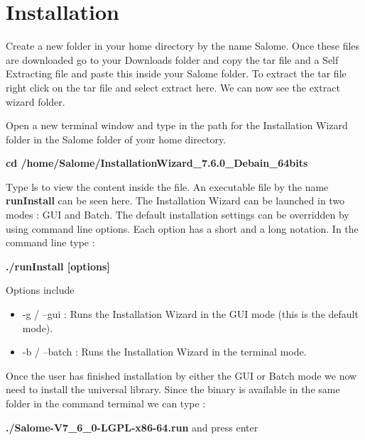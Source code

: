 \section{Installation}

Create a new folder in your home directory by the name Salome. Once these files are downloaded go to your Downloads folder and copy the tar file and a Self Extracting file and paste this inside your Salome folder. To extract the tar file right click on the tar file and select extract here. We can now see the extract wizard folder. \newline

Open a new terminal window and type in the path for the Installation Wizard folder in  the Salome folder of your home directory. \newline

\centering \textbf {cd /home/Salome/InstallationWizard\_7.6.0\_Debain\_64bits} \newline

\flushleft Type ls to view the content inside the file. An executable file by the name \textbf{runInstall} can be seen here. The Installation Wizard can be launched in two modes : GUI and Batch. The default installation settings can be overridden by using command line options. Each option has a short and a long notation. In the command line type : \newline

\centering \textbf{ ./runInstall [options]} \newline 

\flushleft Options include 

\begin{itemize}

\item -g / --gui : Runs the Installation Wizard in the GUI mode (this is the default mode).

\item -b / --batch : Runs the Installation Wizard in the terminal mode.

\end{itemize}

\flushleft Once the user has finished installation by either the GUI or Batch mode we now need to install the universal library. Since the binary is available in the same folder in the 
command terminal we can type : \newline 

\centering \textbf{ ./Salome-V7\_6\_0-LGPL-x86-64.run} and press enter \newline

